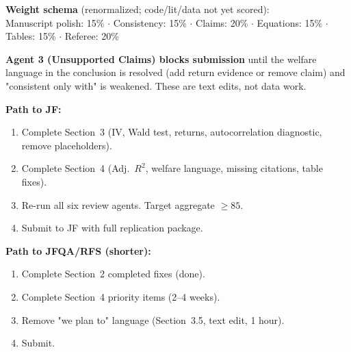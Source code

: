 \documentclass[11pt, a4paper]{article}
\begin{document}
\noindent\textbf{Weight schema} (renormalized; code/lit/data not yet scored):\\[0.3em]
Manuscript polish: 15\% $\cdot$ Consistency: 15\% $\cdot$ Claims: 20\% $\cdot$
Equations: 15\% $\cdot$ Tables: 15\% $\cdot$ Referee: 20\%

\vspace{1em}
\noindent\textcolor{critred}{\textbf{Agent 3 (Unsupported Claims) blocks submission}} until the welfare language
in the conclusion is resolved (add return evidence or remove claim) and "consistent only with"
is weakened. These are text edits, not data work.

\vspace{1em}
\noindent\textbf{Path to JF:}
\begin{enumerate}[leftmargin=2em]
  \item Complete Section~3 (IV, Wald test, returns, autocorrelation diagnostic, remove placeholders).
  \item Complete Section~4 (Adj.~$R^2$, welfare language, missing citations, table fixes).
  \item Re-run all six review agents. Target aggregate $\geq 85$.
  \item Submit to JF with full replication package.
\end{enumerate}

\vspace{1em}
\noindent\textbf{Path to JFQA/RFS (shorter):}
\begin{enumerate}[leftmargin=2em]
  \item Complete Section~2 completed fixes (done).
  \item Complete Section~4 priority items (2--4 weeks).
  \item Remove "we plan to" language (Section~3.5, text edit, 1 hour).
  \item Submit.
\end{enumerate}
\end{document}
